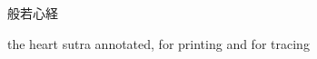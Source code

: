 \documentclass[letterpaper]{article}
\begin{document}
	\centering
	
	\vspace*{3cm}
	
	{
		\fontsize{70}{70}
		般若心経
	}

\vspace*{1cm}

	{
		\Large
		the heart sutra annotated, for printing and for tracing	

}



	
	




%

\shoutout
\end{document}
